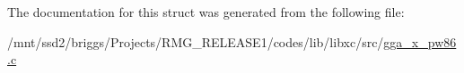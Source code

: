 The documentation for this struct was generated from the following file\-:\begin{DoxyCompactItemize}
\item 
/mnt/ssd2/briggs/\-Projects/\-R\-M\-G\-\_\-\-R\-E\-L\-E\-A\-S\-E1/codes/lib/libxc/src/\hyperlink{gga__x__pw86_8c}{gga\-\_\-x\-\_\-pw86.\-c}\end{DoxyCompactItemize}
